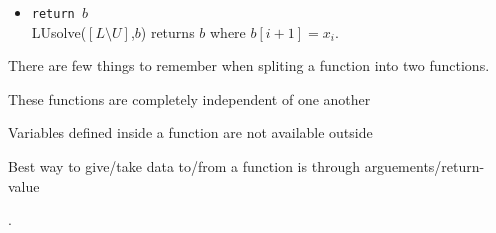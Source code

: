 \begin{remark}
\begin{commentary}
\begin{itemize}
		\item \texttt{return $b$} \\ LUsolve($[L\text{\textbackslash{}}U]$,$b$) returns $b$ where $b[i+1]=x_i$.
\end{itemize}
	There are few things to remember when spliting a function into two functions. \begin{enumerate*} \item These functions are completely independent of one another \item Variables defined inside a function are not available outside \item Best way to give/take data to/from a function is through arguements/return-value \end{enumerate*}.
\end{commentary}
\end{remark}

